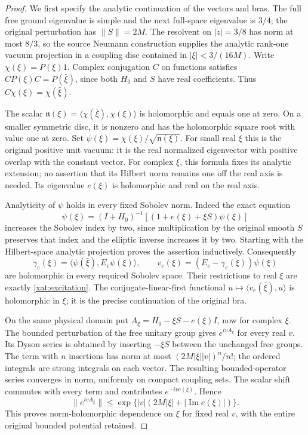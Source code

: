 \begin{proof}
We first specify the analytic continuation of the vectors and bras.
The full free ground eigenvalue is simple and the next full-space
eigenvalue is \(3/4\); the original perturbation has
\(\|S\|=2M\). The resolvent on \(|z|=3/8\) has norm at most
\(8/3\), so the source Neumann construction supplies the analytic
rank-one vacuum projection in a coupling disc contained in
\(|\xi|<3/(16M)\). Write \(\chi(\xi)=P(\xi)1\). Complex
conjugation \(C\) on functions satisfies
\(CP(\xi)C=P(\bar\xi)\), since both \(H_0\) and \(S\) have
real coefficients. Thus
\(C\chi(\xi)=\chi(\bar\xi)\).

The scalar
\(\mathfrak n(\xi)=\langle\chi(\bar\xi),\chi(\xi)\rangle\) is
holomorphic and equals one at zero. On a smaller symmetric disc,
it is nonzero and has the holomorphic square root with value one
at zero. Set \(\psi(\xi)=\chi(\xi)/\sqrt{\mathfrak n(\xi)}\).
For small real \(\xi\) this is the original positive unit vacuum:
it is the real normalized eigenvector with positive overlap with
the constant vector. For complex \(\xi\), this formula fixes its
analytic extension; no assertion that its Hilbert norm remains one
off the real axis is needed. Its eigenvalue \(e(\xi)\) is
holomorphic and real on the real axis.

Analyticity of \(\psi\) holds in every fixed Sobolev norm. Indeed
the exact equation
\[
\psi(\xi)=(I+H_0)^{-1}
             [(1+e(\xi)+\xi S)\psi(\xi)]
\]
increases the Sobolev index by two, since multiplication by the
original smooth \(S\) preserves that index and the elliptic inverse
increases it by two. Starting with the Hilbert-space analytic
projection proves the assertion inductively. Consequently
\[
\gamma_e(\xi)=
 \langle\psi(\bar\xi),E_e\psi(\xi)\rangle,
\qquad v_e(\xi)=(E_e-\gamma_e(\xi))\psi(\xi)
\]
are holomorphic in every required Sobolev space. Their restrictions
to real \(\xi\) are exactly \eqref{xat:excitation}. The
conjugate-linear-first functional
\(u\mapsto\langle v_e(\bar\xi),u\rangle\) is holomorphic in
\(\xi\); it is the precise continuation of the original bra.

On the same physical domain put
\(A_\xi=H_0-\xi S-e(\xi)I\), now for complex \(\xi\).
The bounded perturbation of the free unitary group gives
\(e^{ivA_\xi}\) for every real \(v\). Its Dyson series is
obtained by inserting \(-\xi S\) between the unchanged free
groups. The term with \(n\) insertions has norm at most
\((2M|\xi||v|)^n/n!\); the ordered integrals are strong
integrals on each vector. The resulting bounded-operator series
converges in norm, uniformly on compact coupling sets. The scalar
shift commutes with every term and contributes
\(e^{-iv e(\xi)}\). Hence
\begin{equation}
\|e^{ivA_\xi}\|
 \leq\exp\{ |v|(2M|\xi|+|\operatorname{Im}e(\xi)|)\}.
\label{xat:Dyson-bound}
\end{equation}
This proves norm-holomorphic dependence on \(\xi\) for fixed
real \(v\), with the entire original bounded potential retained.


\end{proof}
